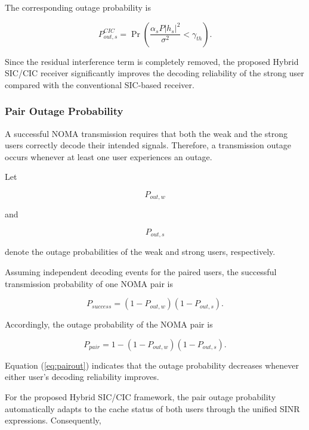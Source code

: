 \documentclass[12pt,a4paper]{article}
\begin{document}
The corresponding outage probability is

\begin{equation}
P_{out,s}^{CIC}
=
\Pr
\left(
\frac{\alpha_sP|h_s|^2}
{\sigma^2}
<
\gamma_{th}
\right).
\end{equation}

Since the residual interference term is completely removed, the proposed Hybrid SIC/CIC receiver significantly improves the decoding reliability of the strong user compared with the conventional SIC-based receiver.

\subsubsection{Pair Outage Probability}

A successful NOMA transmission requires that both the weak and the strong users correctly decode their intended signals. Therefore, a transmission outage occurs whenever at least one user experiences an outage.

Let

\begin{equation}
P_{out,w}
\end{equation}

and

\begin{equation}
P_{out,s}
\end{equation}

denote the outage probabilities of the weak and strong users, respectively.

Assuming independent decoding events for the paired users, the successful transmission probability of one NOMA pair is

\begin{equation}
P_{success}
=
(1-P_{out,w})
(1-P_{out,s}).
\end{equation}

Accordingly, the outage probability of the NOMA pair is

\begin{equation}
P_{pair}
=
1-
(1-P_{out,w})
(1-P_{out,s}).
\label{eq:pairout}
\end{equation}

Equation (\ref{eq:pairout}) indicates that the outage probability decreases whenever either user's decoding reliability improves.

For the proposed Hybrid SIC/CIC framework, the pair outage probability automatically adapts to the cache status of both users through the unified SINR expressions. Consequently,
\end{document}
